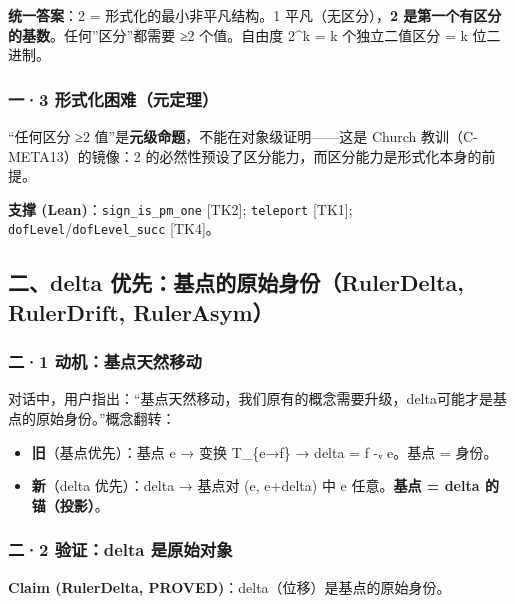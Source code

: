 \documentclass[
]{article}
\providecommand{\tightlist}{%
  \setlength{\itemsep}{0pt}\setlength{\parskip}{0pt}}
\begin{document}
\textbf{统一答案}：2 = 形式化的最小非平凡结构。1
平凡（无区分），\textbf{2 是第一个有区分的基数}。任何''区分''都需要 ≥2
个值。自由度 2\^{}k = k 个独立二值区分 = k 位二进制。

\subsubsection{一·3
形式化困难（元定理）}\label{ux4e003-ux5f62ux5f0fux5316ux56f0ux96beux5143ux5b9aux7406}

``任何区分 ≥2 值''是\textbf{元级命题}，不能在对象级证明------这是 Church
教训（C-META13）的镜像：2
的必然性预设了区分能力，而区分能力是形式化本身的前提。

\textbf{支撑 (Lean)}：\texttt{sign\_is\_pm\_one} {[}TK2{]};
\texttt{teleport} {[}TK1{]}; \texttt{dofLevel}/\texttt{dofLevel\_succ}
{[}TK4{]}。

\subsection{二、delta 优先：基点的原始身份（RulerDelta, RulerDrift,
RulerAsym）}\label{ux4e8cdelta-ux4f18ux5148ux57faux70b9ux7684ux539fux59cbux8eabux4efdrulerdelta-rulerdrift-rulerasym}

\subsubsection{二·1
动机：基点天然移动}\label{ux4e8c1-ux52a8ux673aux57faux70b9ux5929ux7136ux79fbux52a8}

对话中，用户指出：``基点天然移动，我们原有的概念需要升级，delta可能才是基点的原始身份。''概念翻转：

\begin{itemize}
\tightlist
\item
  \textbf{旧}（基点优先）：基点 e → 变换 T\_\{e→f\} → delta = f -ᵥ
  e。基点 = 身份。
\item
  \textbf{新}（delta 优先）：delta → 基点对 (e, e+delta) 中 e
  任意。\textbf{基点 = delta 的锚（投影）}。
\end{itemize}

\subsubsection{二·2 验证：delta
是原始对象}\label{ux4e8c2-ux9a8cux8bc1delta-ux662fux539fux59cbux5bf9ux8c61}

\textbf{Claim (RulerDelta, PROVED)}：delta（位移）是基点的原始身份。
\end{document}
